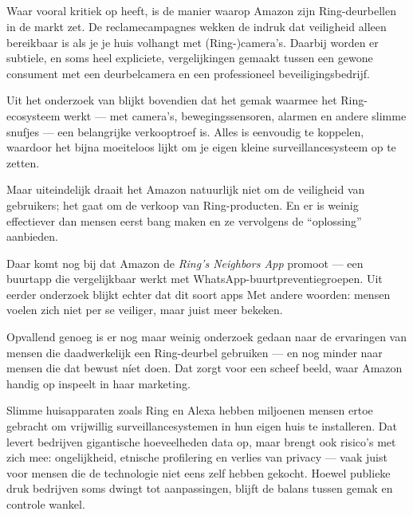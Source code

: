 \documentclass[nonacm,sigconf]{acmart}
\begin{document}
    \subsection{}

    \parencite{kelly2023ring} Waar \citeauthor{kelly2023ring} vooral kritiek op heeft, is de manier waarop Amazon zijn Ring-deurbellen in de markt zet.
    De reclamecampagnes wekken de indruk dat veiligheid alleen bereikbaar is als je je huis volhangt met (Ring-)camera’s.
    Daarbij worden er subtiele, en soms heel expliciete, vergelijkingen gemaakt tussen een gewone consument met een deurbelcamera en een professioneel beveiligingsbedrijf.

    Uit het onderzoek van \citeauthor{kelly2023ring} blijkt bovendien dat het gemak waarmee het Ring-ecosysteem werkt — met camera’s, bewegingssensoren, alarmen en andere slimme snufjes — een belangrijke verkooptroef is.
    Alles is eenvoudig te koppelen, waardoor het bijna moeiteloos lijkt om je eigen kleine surveillancesysteem op te zetten.

    Maar uiteindelijk draait het Amazon natuurlijk niet om de veiligheid van gebruikers; het gaat om de verkoop van Ring-producten.
    En er is weinig effectiever dan mensen eerst bang maken en ze vervolgens de “oplossing” aanbieden.

    Daar komt nog bij dat Amazon de \textit{Ring’s Neighbors App} promoot — een buurtapp die vergelijkbaar werkt met WhatsApp-buurtpreventiegroepen.
    Uit eerder onderzoek blijkt echter dat dit soort apps
    Met andere woorden: mensen voelen zich niet per se veiliger, maar juist meer bekeken.

    Opvallend genoeg is er nog maar weinig onderzoek gedaan naar de ervaringen van mensen die daadwerkelijk een Ring-deurbel gebruiken — en nog minder naar mensen die dat bewust níet doen.
    Dat zorgt voor een scheef beeld, waar Amazon handig op inspeelt in haar marketing.

    Slimme huisapparaten zoals Ring en Alexa hebben miljoenen mensen ertoe gebracht om vrijwillig surveillancesystemen in hun eigen huis te installeren.
    Dat levert bedrijven gigantische hoeveelheden data op, maar brengt ook risico’s met zich mee: ongelijkheid, etnische profilering en verlies van privacy — vaak juist voor mensen die de technologie niet eens zelf hebben gekocht.
    Hoewel publieke druk bedrijven soms dwingt tot aanpassingen, blijft de balans tussen gemak en controle wankel.
\end{document}
